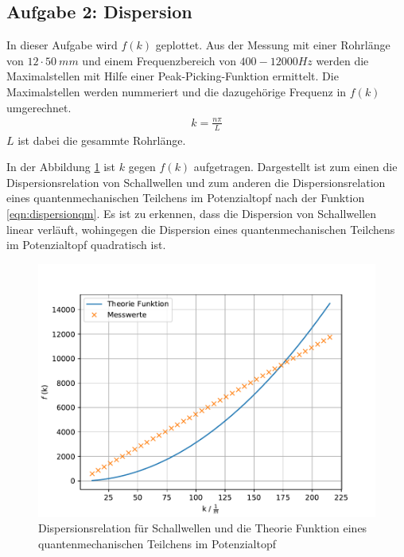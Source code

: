 \subsection{Aufgabe 2: Dispersion}
\FloatBarrier
In dieser Aufgabe wird $f(k)$ geplottet.
Aus der Messung mit einer Rohrlänge von $12\cdot\SI{50}{mm}$ und einem Frequenzbereich von $400-12000\si{Hz}$ werden die Maximalstellen mit Hilfe einer Peak-Picking-Funktion ermittelt.
Die Maximalstellen werden nummeriert und die dazugehörige Frequenz in $f(k)$ umgerechnet.
\begin{align}
  k= \frac{n \pi}{L}
\end{align}
$L$ ist dabei die gesammte Rohrlänge.

In der Abbildung \ref{fig.Aufgabe2} ist $k$ gegen $f(k)$ aufgetragen. Dargestellt ist zum einen die Dispersionsrelation von Schallwellen und zum anderen die Dispersionsrelation eines quantenmechanischen Teilchens im Potenzialtopf nach der Funktion \ref{eqn:dispersionqm}.
Es ist zu erkennen, dass die Dispersion von Schallwellen linear verläuft, wohingegen die Dispersion eines quantenmechanischen Teilchens im Potenzialtopf quadratisch ist.
\begin{figure}[h!]
  \centering
  \includegraphics[width=\textwidth]{f(k).pdf}
  \caption{Dispersionsrelation für Schallwellen und die Theorie Funktion eines quantenmechanischen Teilchens im Potenzialtopf}
  \label{fig.Aufgabe2}
\end{figure}
\FloatBarrier

